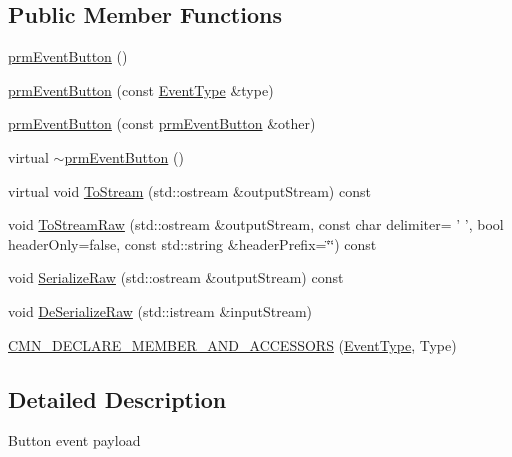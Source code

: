 \subsection*{Public Member Functions}
\begin{DoxyCompactItemize}
\item 
\hyperlink{classprm_event_button_abb601ba30b2ba17e59289416214bd527}{prm\-Event\-Button} ()
\item 
\hyperlink{classprm_event_button_aa506df272acb1954c2be49e2dffbe1dd}{prm\-Event\-Button} (const \hyperlink{classprm_event_button_ad25147a00b664a6df0de483dad956b0b}{Event\-Type} \&type)
\item 
\hyperlink{classprm_event_button_ae44ec7b618d6585575a846a1522bedd8}{prm\-Event\-Button} (const \hyperlink{classprm_event_button}{prm\-Event\-Button} \&other)
\item 
virtual \hyperlink{classprm_event_button_aa9b9e8e0a4c1450a49b113f91f47df62}{$\sim$prm\-Event\-Button} ()
\item 
virtual void \hyperlink{classprm_event_button_a812f67465076aaea87f9d64106072fb0}{To\-Stream} (std\-::ostream \&output\-Stream) const 
\item 
void \hyperlink{classprm_event_button_a2811ddd9856b125f561d9e71dae541b0}{To\-Stream\-Raw} (std\-::ostream \&output\-Stream, const char delimiter= ' ', bool header\-Only=false, const std\-::string \&header\-Prefix=\char`\"{}\char`\"{}) const 
\item 
void \hyperlink{classprm_event_button_a5c8e6692f35b986ab7d53d01b3cece8f}{Serialize\-Raw} (std\-::ostream \&output\-Stream) const 
\item 
void \hyperlink{classprm_event_button_ab93e173e3a451a97a62a23049c810006}{De\-Serialize\-Raw} (std\-::istream \&input\-Stream)
\end{DoxyCompactItemize}
{\bf }\par
\begin{DoxyCompactItemize}
\item 
\hyperlink{classprm_event_button_a86616288c9b71c87bfbd84aaecb50762}{C\-M\-N\-\_\-\-D\-E\-C\-L\-A\-R\-E\-\_\-\-M\-E\-M\-B\-E\-R\-\_\-\-A\-N\-D\-\_\-\-A\-C\-C\-E\-S\-S\-O\-R\-S} (\hyperlink{classprm_event_button_ad25147a00b664a6df0de483dad956b0b}{Event\-Type}, Type)
\end{DoxyCompactItemize}



\subsection{Detailed Description}
Button event payload 

